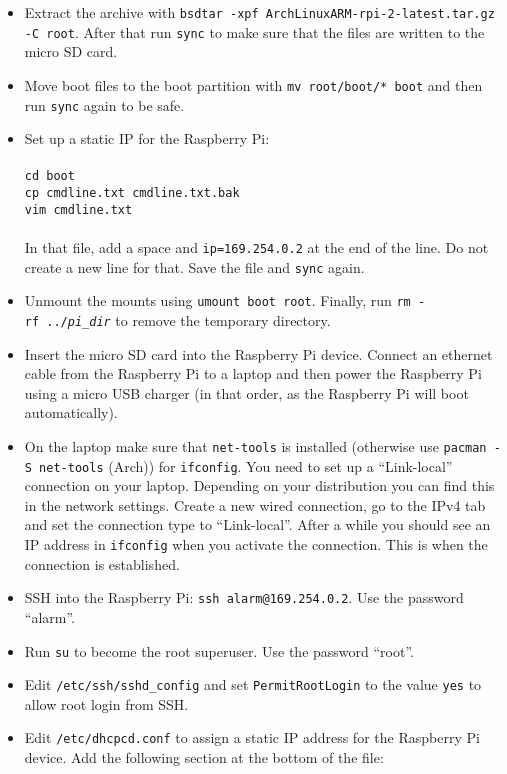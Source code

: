 \documentclass{article}
\newcommand{\arch}{{\color{red} (Arch)}}
\begin{document}
\begin{itemize}
    \item Extract the archive with {\tt bsdtar -xpf 
          ArchLinuxARM-rpi-2-latest.tar.gz -C root}.
          After that run {\tt sync} to make sure that the files are written to 
          the micro SD card.
    \item Move boot files to the boot partition with {\tt mv root/boot/* boot} 
          and then run {\tt sync} again to be safe.
    \item Set up a static IP for the Raspberry Pi: \\\\
          {\tt cd boot} \\
          {\tt cp cmdline.txt cmdline.txt.bak} \\
          {\tt vim cmdline.txt} \\\\
          In that file, add a space and {\tt ip=169.254.0.2} at the end of the 
          line. Do not create a new line for that. Save the file and {\tt sync} 
          again.
    \item Unmount the mounts using {\tt umount boot root}. Finally, run {\tt rm 
          -rf~../\emph{pi\_dir}} to remove the temporary directory.
    \item Insert the micro SD card into the Raspberry Pi device. Connect an 
          ethernet cable from the Raspberry Pi to a laptop and then power the 
          Raspberry Pi using a micro USB charger (in that order, as the 
          Raspberry Pi will boot automatically).
    \item On the laptop make sure that {\tt net-tools} is installed (otherwise 
          use {\tt pacman -S net-tools} \arch{}) for {\tt ifconfig}. You need 
          to set up a ``Link-local'' connection on your laptop. Depending on 
          your distribution you can find this in the network settings. Create 
          a new wired connection, go to the IPv4 tab and set the connection 
          type to ``Link-local''. After a while you should see an IP address in 
          {\tt ifconfig} when you activate the connection. This is when the 
          connection is established.
    \item SSH into the Raspberry Pi: {\tt ssh alarm@169.254.0.2}. Use the 
          password ``alarm''.
    \item Run {\tt su} to become the root superuser. Use the password ``root''.
    \item Edit {\tt /etc/ssh/sshd\_config} and set {\tt PermitRootLogin} to the 
          value {\tt yes} to allow root login from SSH\@.
    \item Edit {\tt /etc/dhcpcd.conf} to assign a static IP address for the
          Raspberry Pi device. Add the following section at the bottom of the
          file:


\end{itemize}
\end{document}
